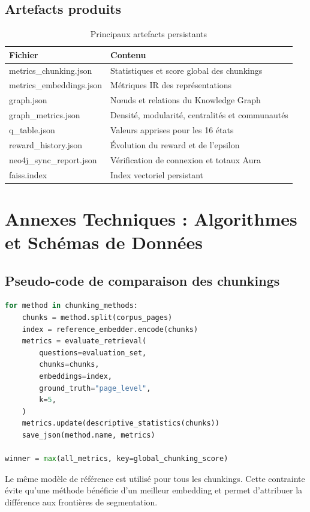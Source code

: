 \documentclass[12pt,a4paper,oneside]{report}
\begin{document}
\begin{appendices}
\section{Artefacts produits}
\begin{table}[H]
\centering
\caption{Principaux artefacts persistants}
\begin{tabularx}{\textwidth}{p{}X}
\toprule
\textbf{Fichier} & \textbf{Contenu}\\
\midrule
metrics\_chunking.json & Statistiques et score global des chunkings\\
metrics\_embeddings.json & Métriques IR des représentations\\
graph.json & Nœuds et relations du Knowledge Graph\\
graph\_metrics.json & Densité, modularité, centralités et communautés\\
q\_table.json & Valeurs apprises pour les 16 états\\
reward\_history.json & Évolution du reward et de l'epsilon\\
neo4j\_sync\_report.json & Vérification de connexion et totaux Aura\\
faiss.index & Index vectoriel persistant\\
\bottomrule
\end{tabularx}
\end{table}


\chapter{Annexes Techniques : Algorithmes et Schémas de Données}
\section{Pseudo-code de comparaison des chunkings}
\begin{lstlisting}[style=code,language=Python]
for method in chunking_methods:
    chunks = method.split(corpus_pages)
    index = reference_embedder.encode(chunks)
    metrics = evaluate_retrieval(
        questions=evaluation_set,
        chunks=chunks,
        embeddings=index,
        ground_truth="page_level",
        k=5,
    )
    metrics.update(descriptive_statistics(chunks))
    save_json(method.name, metrics)

winner = max(all_metrics, key=global_chunking_score)
\end{lstlisting}

Le même modèle de référence est utilisé pour tous les chunkings. Cette contrainte évite qu'une méthode bénéficie d'un meilleur embedding et permet d'attribuer la différence aux frontières de segmentation.


\end{appendices}
\end{document}
